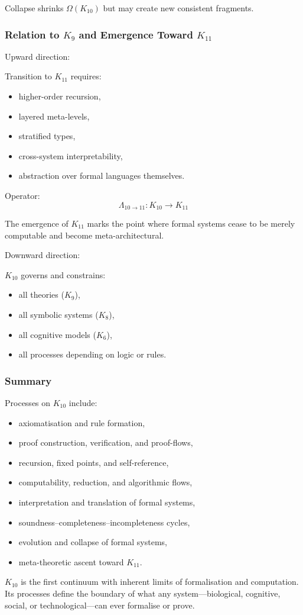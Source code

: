 Collapse shrinks $\Omega(K_{10})$ but may create new consistent fragments.

\subsubsection{Relation to $K_{9}$ and Emergence Toward $K_{11}$}

Upward direction:

Transition to $K_{11}$ requires:
\begin{itemize}
    \item higher-order recursion,
    \item layered meta-levels,
    \item stratified types,
    \item cross-system interpretability,
    \item abstraction over formal languages themselves.
\end{itemize}

Operator:
\[
\Lambda_{10 \to 11}: K_{10} \to K_{11}
\]

The emergence of $K_{11}$ marks the point where
formal systems cease to be merely computable
and become meta-architectural.

Downward direction:

$K_{10}$ governs and constrains:
\begin{itemize}
    \item all theories ($K_9$),
    \item all symbolic systems ($K_8$),
    \item all cognitive models ($K_6$),
    \item all processes depending on logic or rules.
\end{itemize}

\subsubsection{Summary}

Processes on $K_{10}$ include:
\begin{itemize}
    \item axiomatisation and rule formation,
    \item proof construction, verification, and proof-flows,
    \item recursion, fixed points, and self-reference,
    \item computability, reduction, and algorithmic flows,
    \item interpretation and translation of formal systems,
    \item soundness–completeness–incompleteness cycles,
    \item evolution and collapse of formal systems,
    \item meta-theoretic ascent toward $K_{11}$.
\end{itemize}

$K_{10}$ is the first continuum with inherent
limits of formalisation and computation.
Its processes define the boundary of what any system—biological,
cognitive, social, or technological—can ever formalise or prove.
